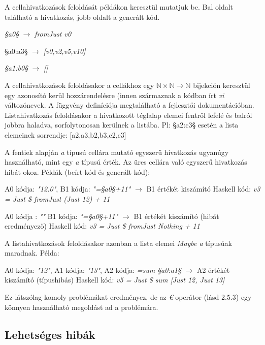 A cellahivatkozások feloldását példákon keresztül mutatjuk be. Bal oldalt található a hivatkozás, jobb oldalt a generált kód.
\begin{compactenum}
	\item \textit{§a0§} $\rightarrow$ \textit{fromJust v0}
	\item §a0:a3§ $\rightarrow$ \textit{[v0,v2,v5,v10]}
	\item \textit{§a1:b0§} $\rightarrow$ \textit{[]}
\end{compactenum}

A cellahivatkozások feloldásakor a cellákhoz egy $\mathbb{N} \times \mathbb{N} \rightarrow \mathbb{N}$ bijekción keresztül egy azonosító kerül hozzárendelésre (innen származnak a kódban írt \textit{vi} változónevek. A függvény definíciója megtalálható a fejlesztői dokumentációban. Listahivatkozás feloldásakor a hivatkozott téglalap elemei fentről lefelé és balról jobbra haladva, sorfolytonosan kerülnek a listába. Pl: §a2:c3§ esetén a lista elemeinek sorrendje: [a2,a3,b2,b3,c2,c3]

A fentiek alapján \textit{a} típusú cellára mutató egyszerű hivatkozás ugyanúgy használható, mint egy \textit{a} típusú érték. Az üres cellára való egyszerű hivatkozás hibát okoz. Példák (beírt kód és generált kód):
\begin{compactenum}
	\item A0 kódja: \textit{"12.0"}, B1 kódja: \textit{"=§a0§+11"} $\rightarrow$ B1 értékét kiszámító Haskell kód: \textit{v3 = Just \$ fromJust (Just 12) + 11}
	\item A0 kódja : \textit{""} B1 kódja: \textit{"=§a0§+11"} $\rightarrow$ B1 értékét kiszámító (hibát eredményező) Haskell kód: \textit{v3 = Just \$ fromJust Nothing + 11}
\end{compactenum}

A listahivatkozások feloldásakor azonban a lista elemei \textit{Maybe a} típusúak maradnak. Példa:

A0 kódja: \textit{"12"}, A1 kódja: \textit{"13"}, A2 kódja: \textit{=sum §a0:a1§} $\rightarrow$ A2 értékét kiszámító (típushibás) Haskell kód: \textit{v5 = Just \$ sum [Just 12, Just 13]}

Ez látszólag komoly problémákat eredményez, de az \textit{€} operátor (lásd 2.5.3) egy könnyen használható megoldást ad a problémára.

\subsection{Lehetséges hibák}

